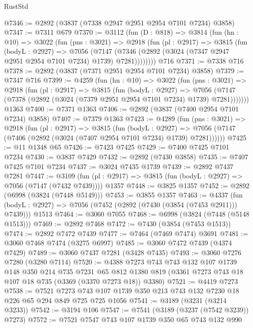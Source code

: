 \begin{lexlean}{RustStd}
\begin{coremodule}
@7346 := @2892 (@3837 (@7338 @2947 @2951 @2954 @7101 @7234) @3858)
@7347 := @7311 @679
@7370 := @3112
    (fun (D : @818) =>
    @3814
      (fun (hn : @10) =>
      @3022
        (fun (pns : @3021) =>
        @2918
          (fun (pl : @2917) =>
          @3815
            (fun (bodyL : @2927) =>
            @7056
              (@7147 (@7346 (@2892 (@3024 (@7347 @2947 @2951 @2954 @7101 @7234) @1739) @7281))))))))
    @716
@7371 := @7338 @716
@7378 := @2892 (@3837 (@7371 @2951 @2954 @7101 @7234) @3858)
@7379 := @7347 @716
@7399 := @4259
    (fun (hn : @10) =>
    @3022
      (fun (pns : @3021) =>
      @2918
        (fun (pl : @2917) =>
        @3815
          (fun (bodyL : @2927) =>
          @7056 (@7147 (@7378 (@2892 (@3024 (@7379 @2951 @2954 @7101 @7234) @1739) @7281)))))))
    @1363
@7400 := @7371 @1363
@7406 := @2892 (@3837 (@7400 @2954 @7101 @7234) @3858)
@7407 := @7379 @1363
@7423 := @4289
    (fun (pns : @3021) =>
    @2918
      (fun (pl : @2917) =>
      @3815
        (fun (bodyL : @2927) =>
        @7056 (@7147 (@7406 (@2892 (@3024 (@7407 @2954 @7101 @7234) @1739) @7281))))))
@7425 := @11 @1348 @65
@7426 := @7423 @7425
@7429 := @7400 @7425 @7101 @7234
@7430 := @3837 @7429
@7432 := @2892 (@7430 @3858)
@7435 := @7407 @7425 @7101 @7234
@7437 := @3024 @7435 @1739
@7439 := @2892 @7437 @7281
@7447 := @3109
    (fun (pl : @2917) => @3815 (fun (bodyL : @2927) => @7056 (@7147 (@7432 @7439))))
    @1357
@7448 := @3825 @1357
@7452 := @2892 (@6998 (@3824 (@7448 @5149)))
@7453 := @3855 @1357
@7463 := @4337
    (fun (bodyL : @2927) => @7056 (@7452 (@2892 (@7430 (@3854 (@7453 @2911))) @7439)))
    @1513
@7464 := @3060 @7055
@7468 := @6998 (@3824 (@7448 (@5148 @1513)))
@7469 := @2892 @7468
@7472 := @7430 (@3854 (@7453 @1513))
@7474 := @2892 @7472 @7439
@7477 := @7464 (@7469 @7474) @3691
@7481 := @3060 @7468 @7474 (@3275 @6997)
@7485 := @3060 @7472 @7439 (@4374 @7429)
@7489 := @3060 @7437 @7281 (@3428 @7435)
@7493 := @3060 @7276 @7280 (@3280 @7114)
@7520 := @4388
    @7273
    @743
    @743
    @132
    @107
    @1739
    @148
    @350
    @214
    @735
    @7231
    @65
    @812
    @1380
    @819
    (@3361 @7273 @743 @18 @107 @18 @735 (@3369 (@3370 @7273 @18)) @3380)
@7521 := @4419 @7273
@7538 := @7521
    @7273
    @743
    @107
    @1739
    @350
    @213
    @743
    @132
    @7230
    @18
    @226
    @65
    @294
    @849
    @725
    @725
    @1056
@7541 := @3189 (@3231 (@3214 @3233))
@7542 := @3194 @106
@7547 := @7541 (@3189 (@3237 (@7542 @3239)) @7273)
@7572 := @7521
    @7547
    @743
    @107
    @1739
    @350
    @65
    @743
    @132
    @990

\end{coremodule}
\end{lexlean}

